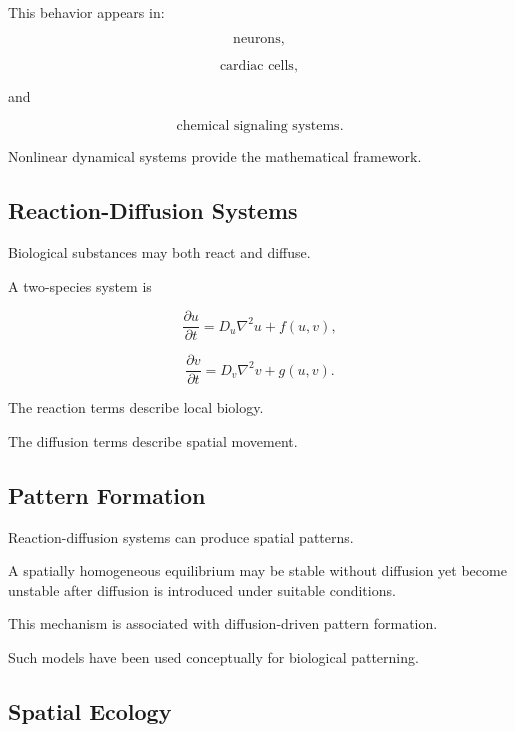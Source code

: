 This behavior appears in:

\[
\boxed{
\text{neurons},
}
\]

\[
\boxed{
\text{cardiac cells},
}
\]

and

\[
\boxed{
\text{chemical signaling systems}.
}
\]

Nonlinear dynamical systems provide the mathematical framework.

\subsection{Reaction-Diffusion Systems}
\label{subsec:biological-reaction-diffusion}

Biological substances may both react and diffuse.

A two-species system is

\[
\boxed{
\frac{\partial u}{\partial t}
=
D_u\nabla^2u
+
f(u,v),
}
\]

\[
\boxed{
\frac{\partial v}{\partial t}
=
D_v\nabla^2v
+
g(u,v).
}
\]

The reaction terms describe local biology.

The diffusion terms describe spatial movement.

\subsection{Pattern Formation}
\label{subsec:biological-pattern-formation}

Reaction-diffusion systems can produce spatial patterns.

A spatially homogeneous equilibrium may be stable without diffusion yet
become unstable after diffusion is introduced under suitable conditions.

This mechanism is associated with diffusion-driven pattern formation.

Such models have been used conceptually for biological patterning.

\subsection{Spatial Ecology}
\label{subsec:spatial-ecology}

